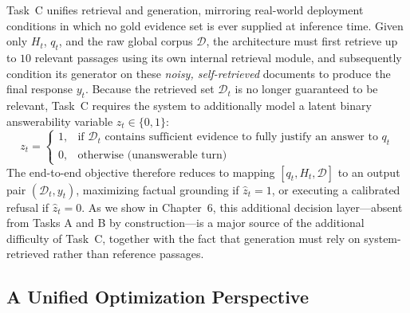 Task~C unifies retrieval and generation, mirroring real-world deployment conditions in which no gold evidence set is ever supplied at inference time. Given only $H_t$, $q_t$, and the raw global corpus $\mathcal{D}$, the architecture must first retrieve up to $10$ relevant passages using its own internal retrieval module, and subsequently condition its generator on these \textit{noisy, self-retrieved} documents to produce the final response $y_t$. Because the retrieved set $\mathcal{D}_t$ is no longer guaranteed to be relevant, Task~C requires the system to additionally model a latent binary answerability variable $z_t \in \{0,1\}$:
\begin{equation}
z_t =
\begin{cases}
1, & \text{if } \mathcal{D}_t \text{ contains sufficient evidence to fully justify an answer to } q_t \\
0, & \text{otherwise (unanswerable turn)}
\end{cases}
\end{equation}
The end-to-end objective therefore reduces to mapping $[q_t, H_t, \mathcal{D}]$ to an output pair $(\mathcal{D}_t, y_t)$, maximizing factual grounding if $\hat{z}_t = 1$, or executing a calibrated refusal if $\hat{z}_t = 0$. As we show in Chapter~6, this additional decision layer---absent from Tasks A and B by construction---is a major source of the additional difficulty of Task~C, together with the fact that generation must rely on system-retrieved rather than reference passages.

\subsection{A Unified Optimization Perspective}
\label{sec:unified-objective}

